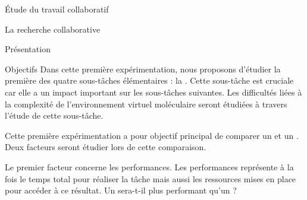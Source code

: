 \documentclass[myfrancais]{mythesis}
\begin{document}
	\begin{mypart}{Étude du travail collaboratif}
		\begin{mychapter}{La recherche collaborative}
			\begin{mysection}{Présentation}
				\begin{mysubsection}{Objectifs}
					Dans cette première expérimentation, nous proposons d'étudier la première des quatre sous-tâches élémentaires : la .
					Cette sous-tâche est cruciale car elle a un impact important sur les sous-tâches suivantes.
					Les difficultés liées à la complexité de l'environnement virtuel moléculaire seront étudiées à travers l'étude de cette sous-tâche.

					Cette première expérimentation a pour objectif principal de comparer un  et un .
					Deux facteurs seront étudier lors de cette comparaison.

					Le premier facteur concerne les performances.
					Les performances représente à la fois le temps total pour réaliser la tâche mais aussi les ressources mises en place pour accéder à ce résultat.
					Un  sera-t-il plus performant qu'un  ?


\end{mysubsection}
\end{mysection}
\end{mychapter}
\end{mypart}
\end{document}
